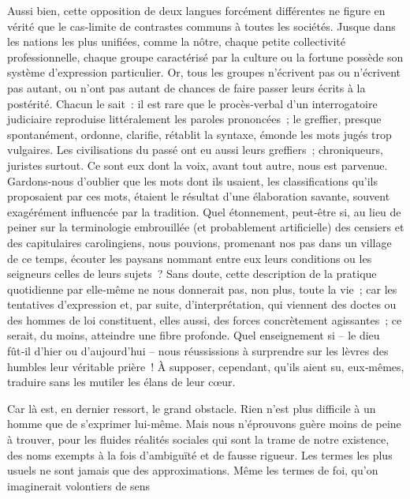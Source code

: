 \documentclass[french,twoside]{book} %
\begin{document}
Aussi bien, cette opposition de deux langues forcément différentes ne figure en vérité que le cas‑limite de contrastes communs à toutes les sociétés. Jusque dans les nations les plus unifiées, comme la nôtre, chaque petite collectivité professionnelle, chaque groupe caractérisé par la culture ou la fortune possède son système d’expression particulier. Or, tous les groupes n’écrivent pas ou n’écrivent pas autant, ou n’ont pas autant de chances de faire passer leurs écrits à la postérité. Chacun le sait : il est rare que le procès‑verbal d’un interrogatoire judiciaire reproduise littéralement les paroles prononcées ; le greffier, presque spontanément, ordonne, clarifie, rétablit la syntaxe, émonde les mots jugés trop vul­gaires. Les civilisations du passé ont eu aussi leurs greffiers ; chroniqueurs, juristes surtout. Ce sont eux dont la voix, avant tout autre, nous est parvenue. Gardons‑nous d’oublier que les mots dont ils usaient, les clas­sifications qu’ils proposaient par ces mots, étaient le résultat d’une élabo­ration savante, souvent exagérément influencée par la tradition. Quel étonnement, peut‑être si, au lieu de peiner sur la terminologie embrouillée (et probablement artificielle) des censiers et des capitulaires carolingiens, nous pouvions, promenant nos pas dans un village de ce temps, écouter les paysans nommant entre eux leurs conditions ou les seigneurs celles de leurs sujets ? Sans doute, cette description de la pratique quoti­dienne par elle‑même ne nous donnerait pas, non plus, toute la vie ; car les tentatives d’expression et, par suite, d’interprétation, qui viennent des doctes ou des hommes de loi constituent, elles aussi, des forces concrètement agissantes ; ce serait, du moins, atteindre une fibre pro­fonde. Quel enseignement si – le dieu fût‑il d’hier ou d’aujourd’hui – nous réussissions à surprendre sur les lèvres des humbles leur véritable prière ! À supposer, cependant, qu’ils aient su, eux‑mêmes, traduire sans les mutiler les élans de leur cœur.\par
Car là est, en dernier ressort, le grand obstacle. Rien n’est plus difficile à un homme que de s’exprimer lui-même. Mais nous n’éprouvons guère moins de peine à trouver, pour les fluides réalités sociales qui sont la trame de notre existence, des noms exempts à la fois d’ambiguïté et de fausse rigueur. Les termes les plus usuels ne sont jamais que des appro­ximations. Même les termes de foi, qu’on imaginerait volontiers de sens  
\end{document}
